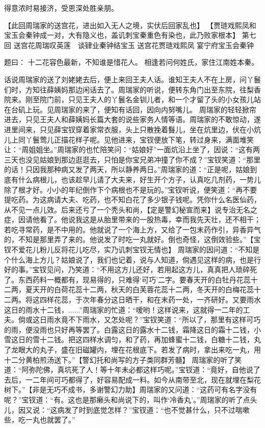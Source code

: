 \documentclass[12pt,oneside]{book}
\begin{document}
得意浓时易接济，受恩深处胜亲朋。
 
【此回周瑞家的送宫花，进出如入无人之境，实伏后回家乱也】
【贾琏戏熙凤和宝玉会秦钟成一对，大有隐义也，盖讥刺宝秦重色有染也，此乃败家根本】
第七回  送宫花周瑞叹英莲　谈肄业秦钟结宝玉
        送宫花贾琏戏熙凤  宴宁府宝玉会秦钟

题曰：
十二花容色最新，不知谁是惜花人。
相逢若问何姓氏，家住江南姓本秦。

话说周瑞家的送了刘姥姥去后，便上来回王夫人话。谁知王夫人不在上房，问丫鬟们时，方知往薛姨妈那边闲话去了。周瑞家的听说，便转东角门出至东院，往梨香院来。刚至院门前，只见王夫人的丫鬟名金钏儿者，和一个才留了头的小女孩儿站在台矶上玩。见周瑞家的来了，便知有话回，因向内努嘴儿。
周瑞家的轻轻掀帘进去，只见王夫人和薛姨妈长篇大套的说些家务人情等语。周瑞家的不敢惊动，遂进里间来，只见薛宝钗穿着家常衣服，头上只散挽着䰖儿，坐在炕里边，伏在小炕儿上同丫鬟莺儿正描花样子呢。见他进来，宝钗便放下笔，转过身来，满面堆笑让：“周姐姐坐。”周瑞家的也忙陪笑问：“姑娘好”一面炕沿上坐了，因说：“这有两三天也没见姑娘到那边逛逛去，只怕是你宝兄弟冲撞了你不成？”宝钗笑道：“那里的话！只因我那种病又发了两天，所以静养两日。”周瑞家的道：“正是呢，姑娘到底有什么病根儿，也该趁早儿请了大夫来，好生开个方子，认真吃几剂药，一势儿除了根才好。小小的年纪倒作下个病根也不是玩的。”宝钗听说，便笑道：“再不要提吃药。为这病请大夫、吃药，也不知白花了多少银子钱呢。凭你什么名医仙药，从不见一点儿效。后来还亏了一个秃头和尚，【定是警幻秘宣而来】说专治无名之症，因请他看了。他说我这是从胎里带来的一股热毒，幸而我先天壮，还不相干；若吃寻常药，是不中用的。他就说了一个海上方，又给了一包末药作引，异香异气的，不知是那里弄了来的。他说发了时吃一丸就好。倒也奇怪，这倒效验些。”【宝钗不爱花儿粉儿反将花儿吃尽，实乃讥刺宝钗无情也】
周瑞家的因问道：“不知是个什么海上方儿？姑娘说了，我们也记着，说与人知道，倘遇见这样的病，也是行好的事。”宝钗见问，乃笑道：“不用这方儿还好，若用起这方儿，真真把人琐碎死了。东西药料一概都有，现易得的，只难得‘可巧’二字。要春天开的白牡丹花蕊十二两，夏天开的白荷花蕊十二两，秋天的白芙蓉花蕊十二两，冬天开的白梅花蕊十二两。将这四样花蕊，于次年春分这日晒干，和在末药一处，一齐研好。又要雨水这日的雨水十二钱，......”周瑞家的忙道：“嗳哟！这样说来，这就得一二年的工夫。倘或这日雨水竟不下雨水，又怎处呢？”宝钗笑道：“所以了，那里有这样可巧的雨，便没雨也只好再等罢了。白露这日的露水十二钱，霜降这日的霜十二钱，小雪这日的雪十二钱。把这四样水调匀，和了药，再加蜂蜜十二钱，白糖十二钱，丸了龙眼大的丸子，盛在旧磁罐内，埋在花根底下。若发了病时，拿出来吃一丸，用十二分黄柏煎汤送下。”【警幻托和尚写的方子类同群芳髓】
周瑞家的听了笑道：“阿弥陀佛，真坑死了人！等十年未必都这样巧呢。”宝钗道：“竟好，自他说了去后，一二年间可巧都得了，好容易配成一料。如今从南带至北，现在就埋在梨花树下。”【非是无巧不成书，多谢警幻力助】周瑞家的又问道：“这药可有名字没有呢？”宝钗道：“有。这也是那癞头和尚说下的，叫作‘冷香丸’。”周瑞家的听了点头儿，因又说：“这病发了时到底觉怎样？”宝钗道：“也不觉甚什么，只不过喘嗽些，吃一丸也就罢了。”
\end{document}
